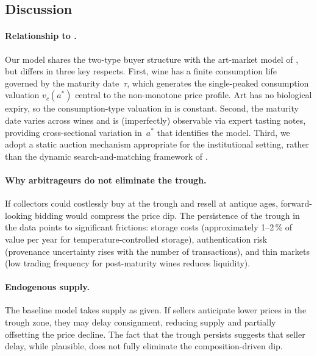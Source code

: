 \subsection{Discussion}
\label{sec:model:discussion}

\paragraph{Relationship to \citet{lovo2018}.}
Our model shares the two-type buyer structure with the art-market
model of \citet{lovo2018}, but differs in three key respects.
First, wine has a finite consumption life governed by the maturity
date~$\tau$, which generates the single-peaked consumption valuation
$v_{c}(a^{*})$ central to the non-monotone price profile.
Art has no biological expiry, so the consumption-type valuation in
\citet{lovo2018} is constant.
Second, the maturity date varies across wines and is (imperfectly)
observable via expert tasting notes, providing cross-sectional
variation in~$a^{*}$ that identifies the model.
Third, we adopt a static auction mechanism appropriate for the
institutional setting, rather than the dynamic search-and-matching
framework of \citet{lovo2018}.

\paragraph{Why arbitrageurs do not eliminate the trough.}
If collectors could costlessly buy at the trough and resell at
antique ages, forward-looking bidding would compress the price dip.
The persistence of the trough in the data points to significant
frictions: storage costs (approximately 1--2\,\% of value per year
for temperature-controlled storage), authentication risk (provenance
uncertainty rises with the number of transactions), and thin markets
(low trading frequency for post-maturity wines reduces liquidity).

\paragraph{Endogenous supply.}
The baseline model takes supply as given.  If sellers anticipate
lower prices in the trough zone, they may delay consignment,
reducing supply and partially offsetting the price decline.  The fact
that the trough persists suggests that seller delay, while plausible,
does not fully eliminate the composition-driven dip.

